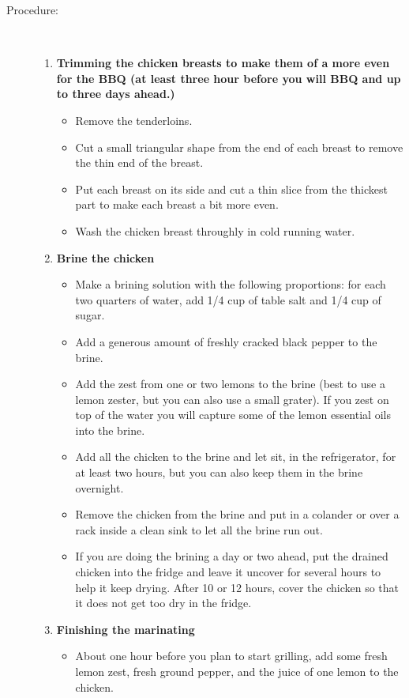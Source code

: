 \documentclass[11pt,letterpaper]{article}
\begin{document}
\begin{description}
\item[Procedure:]\ \\
	\begin{enumerate}
	\item {\bf Trimming the chicken breasts to make them of a more even for the BBQ (at least three hour before you will BBQ and up to three days ahead.)}
	\begin{itemize}
	\item Remove the tenderloins.
	\item Cut a small triangular shape from the end of each breast to remove the thin end of the breast.
	\item Put each breast on its side and cut a thin slice from the thickest part to make each breast a bit more even.
	\item Wash the chicken breast throughly in cold running water.
	\end{itemize}
	\item {\bf Brine the chicken}
	\begin{itemize}
	\item Make a brining solution with the following proportions: for each  two quarters of water, add 1/4 cup of table salt and 1/4 cup of sugar.
	 \item Add a generous amount of freshly cracked black pepper to the brine.
	 \item Add the zest from one or two lemons to the brine (best to use a lemon zester, but you can also use a small grater). If you zest on top of the water you will capture some of the lemon essential oils into the brine.
	 \item Add all the chicken to the brine and let sit, in the refrigerator, for at least two hours, but you can also keep them in the brine overnight.
	 \item Remove the chicken from the brine and put in a colander or over a rack inside a clean sink to let all the brine run out. 
	 \item If you are doing the brining a day or two ahead, put the drained chicken into the fridge and leave it uncover for several hours to help it keep drying. After 10 or 12 hours, cover the chicken so that it does not get too dry in the fridge.
	 \end{itemize}
	  \item {\bf Finishing the marinating}
	  \begin{itemize}
	 \item About one hour before you plan to start grilling, add some fresh lemon zest, fresh ground pepper, and the juice of one lemon to the chicken.

\end{itemize}
\end{enumerate}
\end{description}
\end{document}
